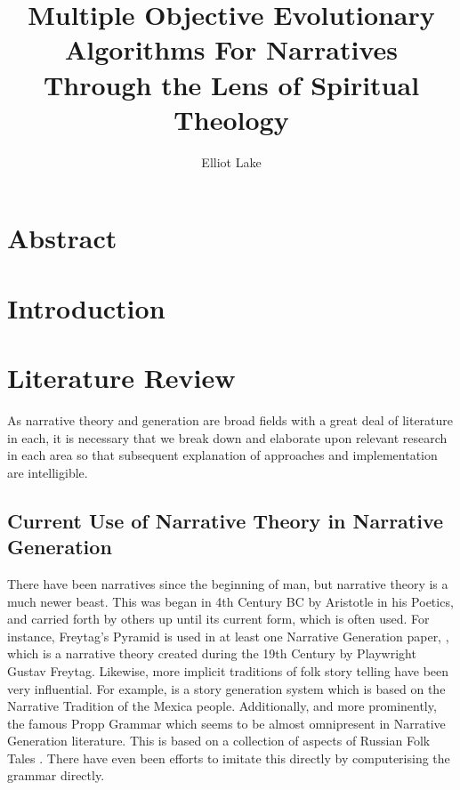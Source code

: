 \documentclass[11pt]{article}
\author{Elliot Lake}
\title{Multiple Objective Evolutionary Algorithms For Narratives Through the Lens of Spiritual Theology}
\begin{document}
\maketitle

\section{Abstract}

\section{Introduction}

\section{Literature Review}
As narrative theory and generation are broad fields with a great deal of literature in each, it is necessary that we break down and elaborate upon relevant research in each area so that subsequent explanation of approaches and implementation are intelligible.

\subsection{Current Use of Narrative Theory in Narrative Generation}
There have been narratives since the beginning of man, but narrative theory is a much newer beast. This was began in 4th Century BC by Aristotle in his Poetics, and carried forth by others up until its current form, which is often used.  For instance, Freytag's Pyramid is used in at least one Narrative Generation paper, \cite{questgeneration}, which is a narrative theory created during the 19th Century by Playwright Gustav Freytag. Likewise, more implicit traditions of folk story telling have been very influential. For example, \cite{MEXICA} is a story generation system which is based on the Narrative Tradition of the Mexica people. Additionally, and more prominently, the famous Propp Grammar which seems to be almost omnipresent in Narrative Generation literature. This is based on a collection of aspects of Russian Folk Tales \cite{propp1975morphology}. There have even been efforts to imitate this directly by computerising the grammar directly\cite{Gervs2013ProppsMO}. \\
\end{document}
